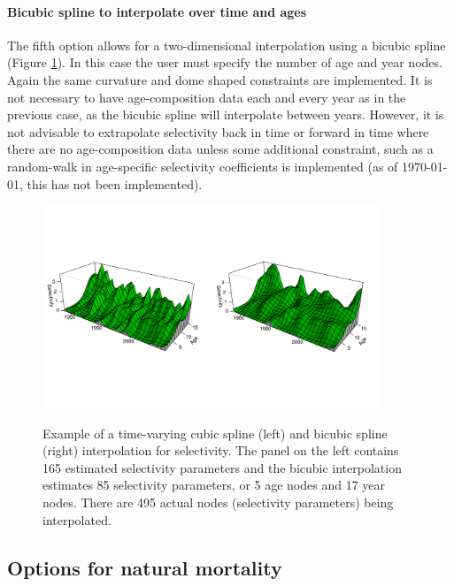 \paragraph{Bicubic spline to interpolate over time and ages}  The fifth option allows for a two-dimensional interpolation using a bicubic spline (Figure \ref{Fig3}).  In this case the user must specify the number of age and year nodes.  Again the same curvature and dome shaped constraints are implemented.  It is not necessary to have age-composition data each and every year as in the previous case, as the bicubic spline will interpolate between years.  However, it is not advisable to extrapolate selectivity back in time or forward in time where there are no age-composition data unless some additional constraint, such as a random-walk in age-specific selectivity coefficients is implemented (as of \today, this has not been implemented).

\begin{figure}[!tbp]
	\centering
	\includegraphics[width=0.9\textwidth]{../Figs/BicubicEg.pdf}\\
	\caption{Example of a time-varying cubic spline (left) and bicubic spline (right) interpolation for selectivity. The panel on the left contains 165 estimated selectivity parameters and the bicubic interpolation estimates 85 selectivity parameters, or 5 age nodes and 17 year nodes. There are 495 actual nodes (selectivity parameters) being interpolated.}\label{Fig3}
\end{figure}






		\subsection{Options for natural mortality}
		

